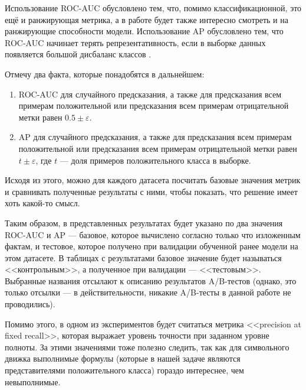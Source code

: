 Использование ROC-AUC обусловлено тем, что, помимо классификационной, это ещё и ранжирующая метрика, а в работе будет также интересно смотреть и на ранжирующие способности модели. Использование AP обусловлено тем, что ROC-AUC начинает терять репрезентативность, если в выборке данных появляется большой дисбаланс классов \cite{ap-vs-roc-auc-paper}.

Отмечу два факта, которые понадобятся в дальнейшем:

\begin{enumerate}
    \item ROC-AUC для случайного предсказания, а также для предсказания всем примерам положительной или предсказания всем примерам отрицательной метки равен $0.5 \pm \varepsilon$.
    \item AP для случайного предсказания, а также для предсказания всем примерам положительной или предсказания всем примерам отрицательной метки равен $t \pm \varepsilon$, где $t$ --- доля примеров положительного класса в выборке.
\end{enumerate}

Исходя из этого, можно для каждого датасета посчитать базовые значения метрик и сравнивать полученные результаты с ними, чтобы показать, что решение имеет хоть какой-то смысл.

Таким образом, в представленных результатах будет указано по два значения ROC-AUC и AP --- базовое, которое вычислено согласно только что изложенным фактам, и тестовое, которое получено при валидации обученной ранее модели на этом датасете. В таблицах с результатами базовое значение будет называться <<контрольным>>, а полученное при валидации --- <<тестовым>>. Выбранные названия отсылают к описанию результатов A/B-тестов (однако, это только отсылки --- в действительности, никакие A/B-тесты в данной работе не проводились).

Помимо этого, в одном из экспериментов будет считаться метрика <<precision at fixed recall>>, которая выражает уровень точности при заданном уровне полноты. За этими значениями тоже полезно следить, так как для символьного движка выполнимые формулы (которые в нашей задаче являются представителями положительного класса) гораздо интереснее, чем невыполнимые.


\newpage

